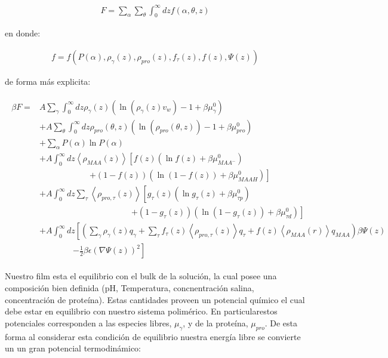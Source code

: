 \begin{align}
	F = \sum_\alpha \sum_\theta \int_0^\infty dz f(\alpha, \theta,z)
\end{align}

\noindent en donde:

\begin{align}
	 f=  f \left( P(\alpha), \rho_\gamma(z),\rho_{pro}(z), f_\tau(z), f(z), \Psi(z)  \right)
	 \label{eq:film:funcionales}
 \end{align}

de forma m\'as explicita:

\begin{align}
	\begin{aligned}
		\beta F=  & A\sum_{\gamma}\int_0^\infty{dz\rho_\gamma(z)\left(\ln \left(\rho_\gamma (z)v_w\right) -1 + \beta\mu^0_\gamma\right)} \\
		&+ A\sum_{\theta}\int_0^\infty{dz\rho_{pro}(\theta,z)\left(\ln \left(\rho_{pro}(\theta,z)\right) -1 + \beta\mu^0_{pro} \right)} \\
		&+ \sum_\alpha{P(\alpha)\ln P(\alpha)} \\
		& + A\int_0^\infty dz \left<\rho_{MAA}(z)\right> \left[f(z)(\ln f(z)+ \beta\mu^0_{MAA^-})\right.\\
		& \qquad\qquad\qquad \left.+(1-f(z))(\ln (1-f(z))+\beta\mu^0_{MAAH})\right] \\
		& + A\int_0^\infty dz \sum_\tau \left<\rho_{pro,\tau}(z)\right> \left[g_\tau(z)(\ln g_\tau(z)+ \beta\mu^0_{\tau p})\right.\\
		&\qquad \qquad \qquad\qquad \qquad\quad \left.+(1-g_\tau(z))(\ln (1-g_\tau(z))+\beta\mu^0_{\tau d})\right]   \\
		 & +A\int_0^\infty dz \left[\left(\sum_{\gamma } {\rho_\gamma(z) q_\gamma + \sum_\tau{f_\tau(z) \left<\rho_{pro,\tau}(z)\right> q_\tau} +  f(z)\left<\rho_{MAA}(r)\right>q_{MAA}}\right)\beta\Psi(z) \right. \\ & \qquad \qquad \left.-\frac{1}{2}\beta\epsilon(\nabla\Psi(z))^2 \right]
		\end{aligned}
\end{align}


Nuestro film esta el equilibrio con el bulk de la soluci\'on, la cual posee una composici\'on bien definida (pH, Temperatura, concnentraci\'on salina,  concentraci\'on de prote\'ina). Estas cantidades proveen un potencial qu\'imico el cual debe estar en equilibrio con nuestro sistema polim\'erico. En particularestos potenciales corresponden a las especies libres, $\mu_\gamma$, y de la prote\'ina, $\mu_{pro}$.
De esta forma al considerar esta condici\'on de equilibrio nuestra energ\'ia libre se convierte un un gran potencial termodin\'amico:


